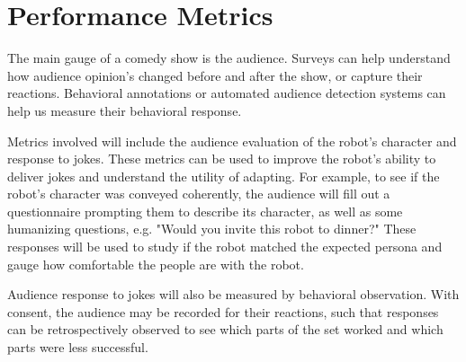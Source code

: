 \documentclass[onecolumn, draftclsnofoot,10pt, compsoc]{IEEEtran}
\begin{document}
\section{Performance Metrics}

The main gauge of a comedy show is the audience. Surveys can help understand how audience opinion's changed before and after the show, or capture their reactions. Behavioral annotations or automated audience detection systems can help us measure their behavioral response.

Metrics involved will include the audience evaluation of the robot’s character and response to jokes. These metrics can be used to improve the robot's ability to deliver jokes and understand the utility of adapting. For example, to see if the robot’s character was conveyed coherently, the audience will fill out a questionnaire prompting them to describe its character, as well as some humanizing questions, e.g. "Would you invite this robot to dinner?" These responses will be used to study if the robot matched the expected persona and gauge how comfortable the people are with the robot. 

Audience response to jokes will also be measured by behavioral observation. With consent, the audience may be recorded for their reactions, such that responses can be retrospectively observed to see which parts of the set worked and which parts were less successful. 




\end{document}
